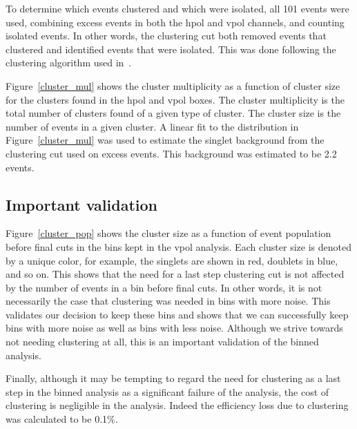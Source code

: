 To determine which events clustered and which were isolated, all 101 events were used, combining excess events in both the \gls{hpol} and \gls{vpol} channels, and counting isolated events. In other words, the clustering cut both removed events that clustered and identified events that were isolated. This was done following the clustering algorithm used in~\cite{anita2}.

Figure~\ref{cluster_mul} shows the cluster multiplicity as a function of cluster size for the clusters found in the \gls{hpol} and \gls{vpol} boxes. The cluster multiplicity is the total number of clusters found of a given type of cluster. The cluster size is the number of events in a given cluster. A linear fit to the distribution in Figure~\ref{cluster_mul} was used to estimate the singlet background from the clustering cut used on excess events. This background was estimated to be 2.2 events. 

\subsection{Important validation}

Figure~\ref{cluster_pop} shows the cluster size as a function of event population before final cuts in the bins kept in the \gls{vpol} analysis. Each cluster size is denoted by a unique color, for example, the singlets are shown in red, doublets in blue, and so on. This shows that the need for a last step clustering cut is not affected by the number of events in a bin before final cuts. In other words, it is not necessarily the case that clustering was needed in bins with more noise. This validates our decision to keep these bins and shows that we can successfully keep bins with more noise as well as bins with less noise. Although we strive towards not needing clustering at all, this is an important validation of the binned analysis. 

Finally, although it may be tempting to regard the need for clustering as a last step in the binned analysis as a significant failure of the analysis, the cost of clustering is negligible in the analysis. Indeed the efficiency loss due to clustering was calculated to be 0.1\%. 


